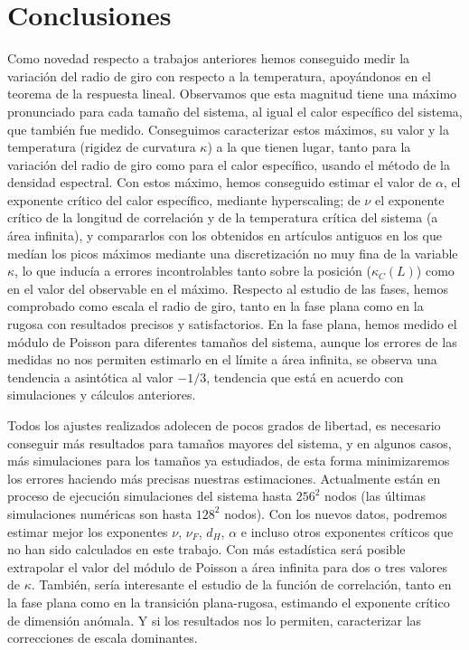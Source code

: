 \chapter{Conclusiones}

Como novedad respecto a trabajos anteriores hemos conseguido medir la
variación del radio de giro con respecto a la temperatura,
apoyándonos en el teorema de la respuesta lineal. Observamos que esta magnitud
tiene una máximo pronunciado para cada tamaño del sistema, al igual el calor
específico del sistema, que también fue medido. Conseguimos caracterizar estos
máximos, su valor y la temperatura (rigidez de curvatura $\kappa$) a la que
tienen lugar, tanto para la
variación del radio de giro como para el calor específico, usando el
método de la densidad espectral. Con estos máximo, hemos conseguido
estimar el valor de $\alpha$, el exponente crítico del calor específico, mediante
hyperscaling; de $\nu$ el exponente crítico de la longitud de correlación y de
la temperatura crítica del sistema (a área infinita), y compararlos con los
obtenidos en artículos antiguos en los que medían los picos máximos mediante
una discretización no muy fina de la variable $\kappa$, lo que inducía a
errores incontrolables tanto sobre la posición ($\kappa_C(L)$) como en el
valor del observable en el máximo. Respecto al estudio de las fases, hemos
comprobado como escala el radio de giro, tanto en la fase plana como en la
rugosa con resultados precisos y satisfactorios. En la fase plana, hemos
medido el módulo de Poisson para diferentes tamaños del sistema, aunque los
errores de las medidas no nos permiten estimarlo 
en el límite a área infinita, se observa una tendencia a asintótica al valor
$-1/3$, tendencia que está en acuerdo con simulaciones y cálculos anteriores.

Todos los ajustes realizados adolecen de pocos grados de libertad, es necesario conseguir
más resultados para tamaños mayores del sistema, y en algunos casos, más simulaciones para los
tamaños ya estudiados, de esta forma minimizaremos los errores haciendo más
precisas nuestras estimaciones. Actualmente están en proceso de ejecución simulaciones
del sistema hasta $256^2$ nodos (las últimas simulaciones numéricas son hasta
$128^2$ nodos). Con los nuevos datos, podremos estimar mejor
los exponentes $\nu$, $\nu_F$, $d_H$, $\alpha$ e incluso otros exponentes
críticos que no han sido calculados en este trabajo. Con más estadística será
posible extrapolar el valor del módulo de Poisson a área infinita para dos o
tres valores de $\kappa$. También, sería interesante 
el estudio de la función de correlación, tanto en la fase plana como en la
transición plana-rugosa, estimando el exponente crítico de dimensión
anómala. Y si los resultados nos lo permiten, caracterizar las correcciones de
escala dominantes.

